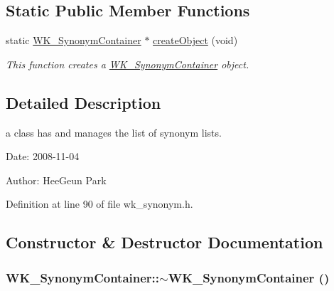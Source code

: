 \subsection*{Static Public Member Functions}
\begin{CompactItemize}
\item 
static \hyperlink{classWK__SynonymContainer}{WK\_\-SynonymContainer} $\ast$ \hyperlink{classWK__SynonymContainer_fa754cbf496ae4419d3c145ca8e7513d}{createObject} (void)
\begin{CompactList}\small\item\em This function creates a \hyperlink{classWK__SynonymContainer}{WK\_\-SynonymContainer} object. \item\end{CompactList}\end{CompactItemize}


\subsection{Detailed Description}
a class has and manages the list of synonym lists. 

\begin{Desc}
\item[Date:]2008-11-04 \end{Desc}
\begin{Desc}
\item[Author:]HeeGeun Park \end{Desc}


Definition at line 90 of file wk\_\-synonym.h.

\subsection{Constructor \& Destructor Documentation}
\hypertarget{classWK__SynonymContainer_2f305b796f70e83c8589656b3a5bf36a}{
\subsubsection[{$\sim$WK\_\-SynonymContainer}]{\setlength{\rightskip}{0pt plus 5cm}WK\_\-SynonymContainer::$\sim$WK\_\-SynonymContainer ()}}
\label{classWK__SynonymContainer_2f305b796f70e83c8589656b3a5bf36a}




